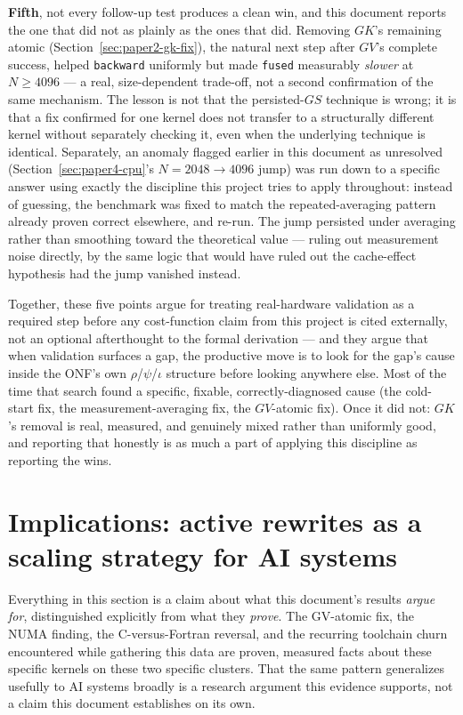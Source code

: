 \documentclass[11pt]{article}
\begin{document}
\textbf{Fifth}, not every follow-up test produces a clean win, and this
document reports the one that did not as plainly as the ones that did.
Removing $GK$'s remaining atomic (Section~\ref{sec:paper2-gk-fix}), the
natural next step after $GV$'s complete success, helped
\texttt{backward} uniformly but made \texttt{fused} measurably
\emph{slower} at $N{\geq}4096$ --- a real, size-dependent trade-off, not
a second confirmation of the same mechanism. The lesson is not that the
persisted-$GS$ technique is wrong; it is that a fix confirmed for one
kernel does not transfer to a structurally different kernel without
separately checking it, even when the underlying technique is
identical. Separately, an anomaly flagged earlier in this document as
unresolved (Section~\ref{sec:paper4-cpu}'s $N{=}2048\to4096$ jump) was
run down to a specific answer using exactly the discipline this project
tries to apply throughout: instead of guessing, the benchmark was fixed
to match the repeated-averaging pattern already proven correct
elsewhere, and re-run. The jump persisted under averaging rather than
smoothing toward the theoretical value --- ruling out measurement noise
directly, by the same logic that would have ruled out the cache-effect
hypothesis had the jump vanished instead.

Together, these five points argue for treating real-hardware validation
as a required step before any cost-function claim from this project is
cited externally, not an optional afterthought to the formal
derivation --- and they argue that when validation surfaces a gap, the
productive move is to look for the gap's cause inside the ONF's own
$\rho$/$\psi$/$\iota$ structure before looking anywhere else. Most of
the time that search found a specific, fixable, correctly-diagnosed
cause (the cold-start fix, the measurement-averaging fix, the
$GV$-atomic fix). Once it did not: $GK$'s removal is real, measured,
and genuinely mixed rather than uniformly good, and reporting that
honestly is as much a part of applying this discipline as reporting the
wins.

\section{Implications: active rewrites as a scaling strategy for AI systems}
\label{sec:implications}

Everything in this section is a claim about what this document's
results \emph{argue for}, distinguished explicitly from what they
\emph{prove}. The GV-atomic fix, the NUMA finding, the C-versus-Fortran
reversal, and the recurring toolchain churn encountered while gathering
this data are proven, measured facts about these specific kernels on
these two specific clusters. That the same pattern generalizes usefully
to AI systems broadly is a research argument this evidence supports,
not a claim this document establishes on its own.
\end{document}
